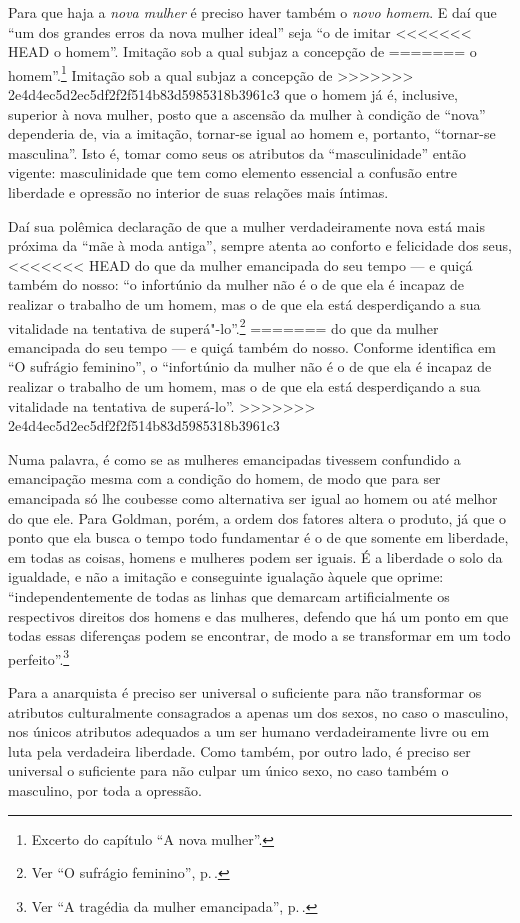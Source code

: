 Para que haja a \textit{nova mulher} é preciso haver também o \textit{novo homem}. E
daí que ``um dos grandes erros da nova mulher ideal'' seja ``o de imitar
<<<<<<< HEAD
o homem''. Imitação sob a qual subjaz a concepção de
=======
o homem''.\footnote{Excerto do capítulo ``A nova mulher''.} Imitação sob a qual subjaz a concepção de
>>>>>>> 2e4d4ec5d2ec5df2f2f514b83d5985318b3961c3
que o homem já é, inclusive, superior à nova mulher, posto que a
ascensão da mulher à condição de ``nova'' dependeria de, via a imitação,
tornar-se igual ao homem e, portanto, ``tornar-se masculina''. Isto é,
tomar como seus os atributos da ``masculinidade'' então vigente:
masculinidade que tem como elemento essencial a confusão entre liberdade e opressão no interior de suas relações mais íntimas.

Daí sua polêmica
declaração de que a mulher verdadeiramente nova está mais próxima da
``mãe à moda antiga'', sempre atenta ao conforto e felicidade dos seus,
<<<<<<< HEAD
do que da mulher emancipada do seu tempo --- e quiçá também do nosso:
``o infortúnio da mulher não é o de que ela é incapaz de realizar o
trabalho de um homem, mas o de que ela está desperdiçando a sua
vitalidade na tentativa de superá"-lo''.\footnote{Ver ``O sufrágio feminino'', p.\,\pageref{secular}.}
=======
do que da mulher emancipada do seu tempo --- e quiçá também do nosso.
Conforme identifica em ``O sufrágio feminino'', o ``infortúnio da mulher
não é o de que ela é incapaz de realizar o trabalho de um homem, mas o
de que ela está desperdiçando a sua vitalidade na tentativa de
superá-lo''. 
>>>>>>> 2e4d4ec5d2ec5df2f2f514b83d5985318b3961c3

Numa palavra, é como se as mulheres emancipadas tivessem
confundido a emancipação mesma com a condição do homem, de modo que para
ser emancipada só lhe coubesse como alternativa ser igual ao homem ou
até melhor do que ele. Para Goldman, porém, a ordem dos fatores
altera o produto, já que o ponto que ela
busca o tempo todo fundamentar é o de que somente em liberdade,
em todas as coisas, homens e mulheres podem ser iguais. É a liberdade
o solo da igualdade, e não a imitação e conseguinte igualação
àquele que oprime: ``independentemente de todas as linhas que demarcam artificialmente os
respectivos direitos dos homens e das mulheres, defendo que há um ponto
em que todas essas diferenças podem se encontrar, de modo a se
transformar em um todo perfeito''.\footnote{Ver ``A tragédia da mulher emancipada'', p.\,\pageref{perfeito}.}


Para
a anarquista é preciso ser universal o suficiente para não transformar
os atributos culturalmente consagrados a apenas um dos sexos, no caso o
masculino, nos únicos atributos adequados a um ser humano
verdadeiramente livre ou em luta pela verdadeira liberdade. Como também,
por outro lado, é preciso ser universal o suficiente para não culpar um
único sexo, no caso também o masculino, por toda a opressão.

